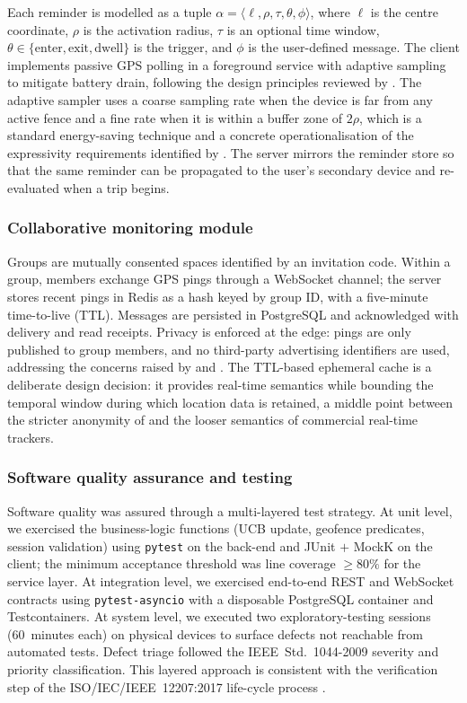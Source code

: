 \documentclass[a4paper,fleqn]{cas-sc}
\begin{document}
	Each reminder is modelled as a tuple $\alpha=\langle \ell, \rho, \tau, \theta, \phi\rangle$, where $\ell$ is the centre coordinate, $\rho$ is the activation radius, $\tau$ is an optional time window, $\theta\in\{\text{enter},\text{exit},\text{dwell}\}$ is the trigger, and $\phi$ is the user-defined message. The client implements passive GPS polling in a foreground service with adaptive sampling to mitigate battery drain, following the design principles reviewed by \citet{shevchenko2024geofencing}. The adaptive sampler uses a coarse sampling rate when the device is far from any active fence and a fine rate when it is within a buffer zone of $2\rho$, which is a standard energy-saving technique and a concrete operationalisation of the expressivity requirements identified by \citet{wang2015beyond}. The server mirrors the reminder store so that the same reminder can be propagated to the user's secondary device and re-evaluated when a trip begins.
	
	\subsubsection{Collaborative monitoring module}\label{sec:collab}
	
	Groups are mutually consented spaces identified by an invitation code. Within a group, members exchange GPS pings through a WebSocket channel; the server stores recent pings in Redis as a hash keyed by group ID, with a five-minute time-to-live (TTL). Messages are persisted in PostgreSQL and acknowledged with delivery and read receipts. Privacy is enforced at the edge: pings are only published to group members, and no third-party advertising identifiers are used, addressing the concerns raised by \citet{shokri2014mobicrowd} and \citet{mckenzie2022privyto}. The TTL-based ephemeral cache is a deliberate design decision: it provides real-time semantics while bounding the temporal window during which location data is retained, a middle point between the stricter anonymity of \citet{li2017locsharing} and the looser semantics of commercial real-time trackers.
	
	\subsubsection{Software quality assurance and testing}\label{sec:qa}
	
	Software quality was assured through a multi-layered test strategy. At unit level, we exercised the business-logic functions (UCB update, geofence predicates, session validation) using \texttt{pytest} on the back-end and JUnit $+$ MockK on the client; the minimum acceptance threshold was line coverage $\geq 80\%$ for the service layer. At integration level, we exercised end-to-end REST and WebSocket contracts using \texttt{pytest-asyncio} with a disposable PostgreSQL container and Testcontainers. At system level, we executed two exploratory-testing sessions (60~minutes each) on physical devices to surface defects not reachable from automated tests. Defect triage followed the IEEE~Std.~1044-2009 severity and priority classification. This layered approach is consistent with the \CBSE{} verification step of the ISO/IEC/IEEE~12207:2017 life-cycle process \citep{iso12207}.
	
\end{document}
